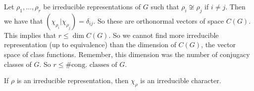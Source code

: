 \begin{remark}
    Let $\rho_1, \ldots, \rho_r$ be irreducible representations of $G$ such that $\rho_i \not\cong \rho_j$ if  $i \neq j$.
    Then we have that $(\chi_{\rho_i} | \chi_{\rho_j} ) = \delta_{ij}$.
    So these are orthonormal vectors of space $C(G)$. 
    This implies that $r \le  \dim C(G)$. So we cannot find more irreducible representation (up to equivalence) than the dimension of $C(G)$, the vector space of class functions.
    Remember, this dimension was the number of conjugacy classes of $G$.
    So  $r \le  \text{\# cong. classes of $G$}$.
\end{remark}

\begin{definition}
    If $\rho$ is an irreducible representation, then $\chi_{\rho}$ is an irreducible character.     
\end{definition}

